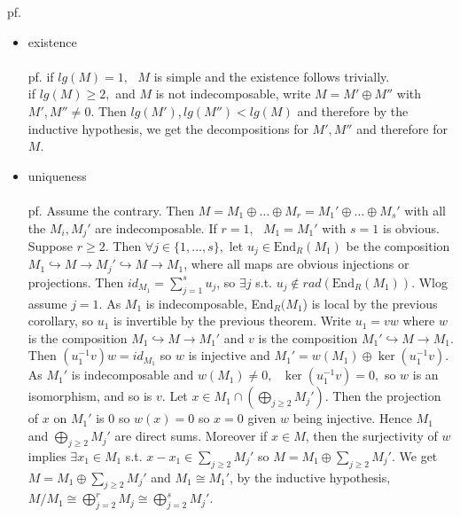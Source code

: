 \documentclass[12pt,letterpaper]{report}
\begin{document}
pf.\begin{itemize}\item existence
\\\\pf. if $lg(M)=1,\,\,\,\,M$ is simple and the existence follows trivially.
\\if $lg(M)\geq2,$ and $M$ is not indecomposable, write $M=M'\oplus M''$ with $M',M''\neq0$. Then $lg(M'),lg(M'')<lg(M)$ and therefore by the inductive hypothesis, we get the decompositions for $M',M''$ and therefore for $M$.
\item uniqueness
\\\\pf. Assume the contrary. Then $M=M_{1}\oplus\dots\oplus M_{r}=M_{1}'\oplus\dots\oplus M_{s}'$ with all the $M_{i},M_{j}'$ are indecomposable. If $r=1,\,\,\,\,M_{1}=M_{1}'$ with $s=1$ is obvious. Suppose $r\geq2.$ Then $\forall j\in\{1,\dots,s\},$ let $u_{j}\in\text{End}_{R}(M_{1})$ be the composition $M_{1}\hookrightarrow M\rightarrow M_{j}'\hookrightarrow M\rightarrow M_{1}$, where all maps are obvious injections or projections. Then $id_{M_{1}}=\sum_{j=1}^{s}u_{j}$, so $\exists j$ s.t. $u_{j}\notin rad(\text{End}_{R}(M_{1}))$. Wlog assume $j=1$. As $M_{1}$ is indecomposable, End$_{R}(M_{1}$) is local by the previous corollary, so $u_{1}$ is invertible by the previous theorem. Write $u_{1}=vw$ where $w$ is the composition $M_{1}\hookrightarrow M\rightarrow M_{1}'$ and $v$ is the composition $M_{1}'\hookrightarrow M\rightarrow M_{1}$. Then $(u_{1}^{-1}v)w=id_{M_{1}}$ so $w$ is injective and $M_{1}'=w(M_{1})\oplus\ker(u_{1}^{-1}v)$. As $M_{1}'$ is indecomposable and $w(M_{1})\neq0,\,\,\,\,\ker(u_{1}^{-1}v)=0,$ so $w$ is an isomorphism, and so is $v$. Let $x\in M_{1}\cap(\bigoplus_{j\geq2}M_{j}')$. Then the projection of $x$ on $M_{1}'$ is 0 so $w(x)=0$ so $x=0$ given $w$ being injective. Hence $M_{1}$ and $\bigoplus_{j\geq2}M_{j}'$ are direct sums. Moreover if $x\in M$, then the surjectivity of $w$ implies $\exists x_{1}\in M_{1}$ s.t. $x-x_{1}\in\sum_{j\geq2}M_{j}'$ so $M=M_{1}\oplus\sum_{j\geq2}M_{j}'$. We get $M=M_{1}\oplus\sum_{j\geq2}M_{j}'$ and $M_{1}\cong M_{1}'$, by the inductive hypothesis, $M/M_{1}\cong\bigoplus_{j=2}^{r}M_{j}\cong\bigoplus_{j=2}^{s}M_{j}'$. 

\end{itemize}
\end{document}

